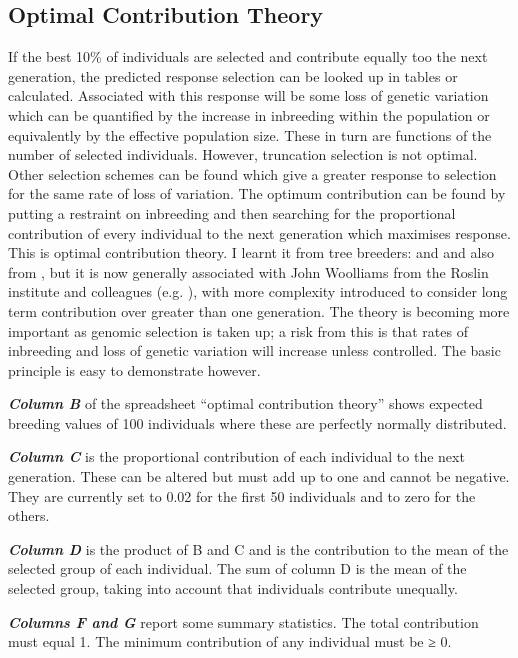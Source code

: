 \documentclass[
]{book}
\begin{document}
\hypertarget{optimal-contribution-theory}{%
\subsection{Optimal Contribution Theory}\label{optimal-contribution-theory}}

If the best 10\% of individuals are selected and contribute equally too the next generation, the predicted response selection can be looked up in tables or calculated. Associated with this response will be some loss of genetic variation which can be quantified by the increase in inbreeding within the population or equivalently by the effective population size. These in turn are functions of the number of selected individuals. However, truncation selection is not optimal. Other selection schemes can be found which give a greater response to selection for the same rate of loss of variation. The optimum contribution can be found by putting a restraint on inbreeding and then searching for the proportional contribution of every individual to the next generation which maximises response. This is optimal contribution theory. I learnt it from tree breeders: \citet{lindgren_deployment_1989} and \citet{lindgren_optimal_1993} and also from \citet{toro_simple_1984}, but it is now generally associated with John Woolliams from the Roslin institute and colleagues (e.g. \citet{woolliams_genetic_2015}), with more complexity introduced to consider long term contribution over greater than one generation. The theory is becoming more important as genomic selection is taken up; a risk from this is that rates of inbreeding and loss of genetic variation will increase unless controlled. The basic principle is easy to demonstrate however.

\textbf{\emph{Column B}} of the spreadsheet ``optimal contribution theory'' shows expected breeding values of 100 individuals where these are perfectly normally distributed.

\textbf{\emph{Column C}} is the proportional contribution of each individual to the next generation. These can be altered but must add up to one and cannot be negative. They are currently set to 0.02 for the first 50 individuals and to zero for the others.

\textbf{\emph{Column D}} is the product of B and C and is the contribution to the mean of the selected group of each individual. The sum of column D is the mean of the selected group, taking into account that individuals contribute unequally.

\textbf{\emph{Columns F and G}} report some summary statistics. The total contribution must equal 1. The minimum contribution of any individual must be ≥ 0.
\end{document}
